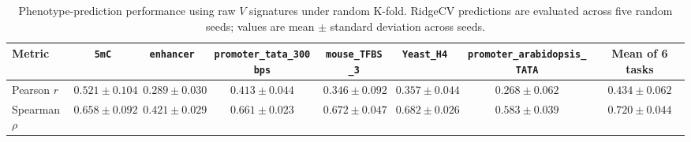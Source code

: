 \begin{table}[t]
  \centering
  \caption{Phenotype-prediction performance using raw $V$ signatures under random K-fold. RidgeCV predictions are evaluated across five random seeds; values are mean $\pm$ standard deviation across seeds.}
  \label{tab:fig4b_v_kfold}
  \small
  \setlength{\tabcolsep}{4.5pt}
  \begin{tabular}{l c c c c c c c}
    \toprule
    Metric & \texttt{5mC} & \texttt{enhancer} & \texttt{promoter\_tata\_300bps} & \texttt{mouse\_TFBS\_3} & \texttt{Yeast\_H4} & \texttt{promoter\_arabidopsis\_TATA} & Mean of 6 tasks \\
    \midrule
    Pearson $r$ & $0.521 \pm 0.104$ & $0.289 \pm 0.030$ & $0.413 \pm 0.044$ & $0.346 \pm 0.092$ & $0.357 \pm 0.044$ & $0.268 \pm 0.062$ & $0.434 \pm 0.062$ \\
    Spearman $\rho$ & $0.658 \pm 0.092$ & $0.421 \pm 0.029$ & $0.661 \pm 0.023$ & $0.672 \pm 0.047$ & $0.682 \pm 0.026$ & $0.583 \pm 0.039$ & $0.720 \pm 0.044$ \\
    \bottomrule
  \end{tabular}
\end{table}
